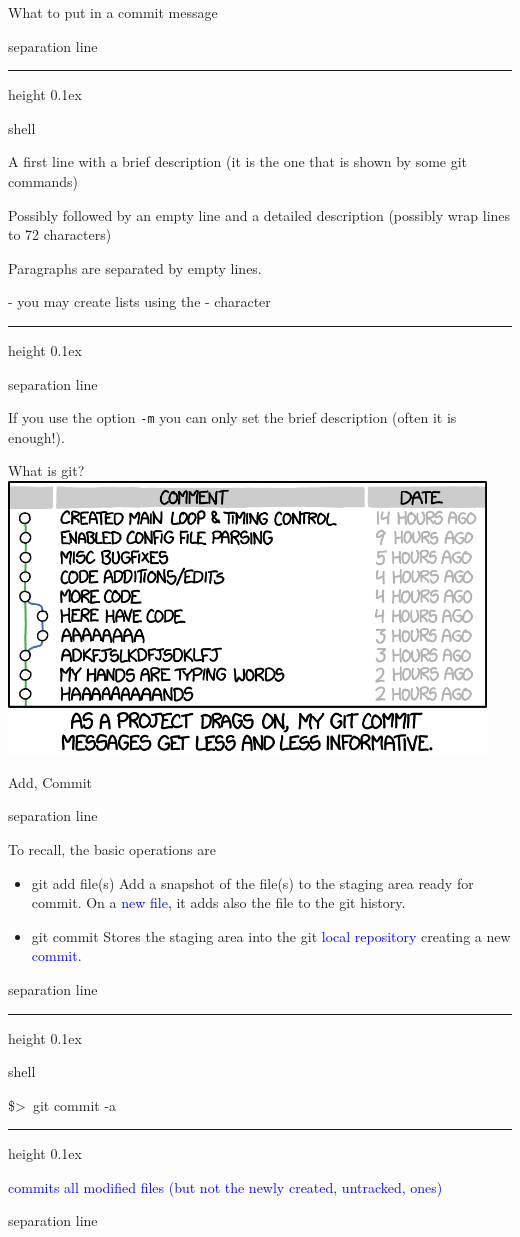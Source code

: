 \documentclass[hyperref={colorlinks}]{beamer}
\newenvironment{shell}{%
\footnotesize\flushleft\hrule height 0.1ex
\tt\begin{beamercolorbox}[sep=1ex,left]{shell}%
}{%
\end{beamercolorbox}
\hrule height 0.1ex
\endflushleft\par
}
\newcommand*{\psone}[1][ant]{\$>~}
\newcommand{\titleline}[1][0.025cm]{%
\begin{beamercolorbox}[wd=\paperwidth,ht=#1,center]{separation line}%
\end{beamercolorbox}%
}
\begin{document}
\begin{frame}{What to put in a commit message}
\titleline
\begin{shell}
A first line with a brief description (it is the one that is shown by some git commands)\\
\vspace{0.3cm}

Possibly followed by an empty line and a detailed description (possibly wrap lines to 72 characters)\\
\vspace{0.3cm}
 
Paragraphs are separated by empty lines.\\
\vspace{0.3cm}
 
- you may create lists using the - character
\end{shell}
\titleline
If you use the option \texttt{-m} \alert{you can only set the brief description} (often it is enough!).
\end{frame}

\begin{frame}{What is git?}
  \centering
  \includegraphics[width=0.95\textwidth]{figures/git_commit_2x.png}
\end{frame}

\begin{frame}{Add, Commit}
  \vspace*{-0.3cm}
\titleline
To recall, the basic operations are
\begin{itemize}
\item \alert{git add file(s)} Add a snapshot of the file(s) to the staging area ready for commit. On a \textcolor{blue}{new file}, it adds also the file to the git history.
\item \alert{git commit} Stores the staging area into the git \textcolor{blue}{local repository} creating a new \textcolor{blue}{commit}.
\end{itemize}
\titleline

\begin{shell}
\psone git commit -a 
\end{shell}
\textcolor{blue}{commits all modified files (but not the newly created, untracked, ones)}
\titleline
\end{frame}
\end{document}

